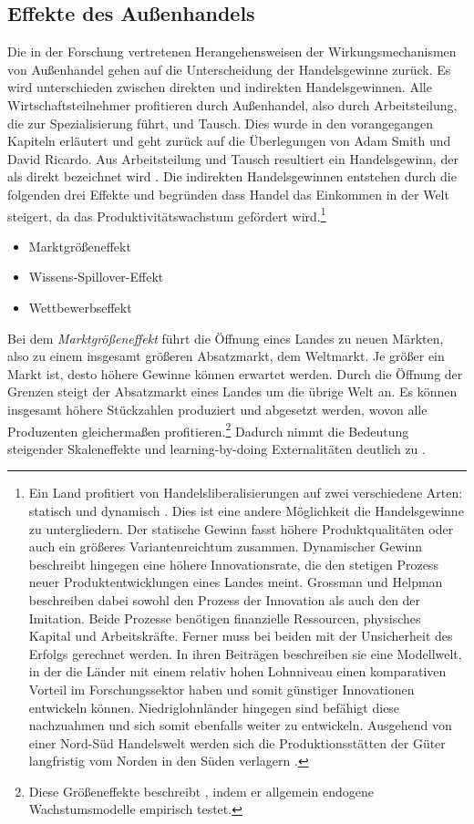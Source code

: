 \subsection{Effekte des Außenhandels}\label{Effekte Handel}
Die in der Forschung vertretenen Herangehensweisen der Wirkungsmechanismen von Außenhandel gehen auf die Unterscheidung der Handelsgewinne zurück. Es wird unterschieden zwischen direkten und indirekten Handelsgewinnen. Alle Wirtschaftsteilnehmer profitieren durch Außenhandel, also durch Arbeitsteilung, die zur Spezialisierung führt, und Tausch. Dies wurde in den vorangegangen Kapiteln erläutert und geht zurück auf die Überlegungen von Adam Smith und David Ricardo. Aus Arbeitsteilung und Tausch resultiert ein Handelsgewinn, der als direkt bezeichnet wird \cite{Mill.1909}. Die indirekten Handelsgewinnen entstehen durch die folgenden drei Effekte und begründen dass Handel das Einkommen in der Welt steigert, da das Produktivitätswachstum gefördert wird.\footnote{Ein Land profitiert von Handelsliberalisierungen auf zwei verschiedene Arten: statisch und dynamisch \cite{Grossman.1989a,Grossman.1991b,Grossman.1991c,RiveraBatiz.,RiveraBatiz.1991a}. Dies ist eine andere Möglichkeit die Handelsgewinne zu untergliedern. Der statische Gewinn fasst höhere Produktqualitäten oder auch ein größeres Variantenreichtum zusammen. Dynamischer Gewinn beschreibt hingegen eine höhere Innovationsrate, die den stetigen Prozess neuer Produktentwicklungen eines Landes meint. Grossman und Helpman beschreiben dabei sowohl den Prozess der Innovation als auch den der Imitation. Beide Prozesse benötigen finanzielle Ressourcen, physisches Kapital und Arbeitskräfte. Ferner muss bei beiden mit der Unsicherheit des Erfolgs gerechnet werden. In ihren Beiträgen beschreiben sie eine Modellwelt, in der die Länder mit einem relativ hohen Lohnniveau einen komparativen Vorteil im Forschungssektor haben und somit günstiger Innovationen entwickeln können. Niedriglohnländer hingegen sind befähigt diese nachzuahmen und sich somit ebenfalls weiter zu entwickeln. Ausgehend von einer Nord-Süd Handelswelt werden sich die Produktionsstätten der Güter langfristig vom Norden in den Süden verlagern \cite{Grossman.1991c}.}
\begin{itemize}
\item [1.] Marktgrößeneffekt
\item [2.] Wissens-Spillover-Effekt
\item [3.] Wettbewerbseffekt
\end{itemize}
Bei dem \textit{Marktgrößeneffekt} führt die Öffnung eines Landes zu neuen Märkten, also zu einem insgesamt größeren Absatzmarkt, dem Weltmarkt. Je größer ein Markt ist, desto höhere Gewinne können erwartet werden. Durch die Öffnung der Grenzen steigt der Absatzmarkt eines Landes um die übrige Welt an. Es können insgesamt höhere Stückzahlen produziert und abgesetzt werden, wovon alle Produzenten gleichermaßen profitieren.\footnote{Diese Größeneffekte beschreibt \cite{Jones.1995a}, indem er allgemein endogene Wachstumsmodelle empirisch testet.} Dadurch nimmt die Bedeutung steigender Skaleneffekte und learning-by-doing Externalitäten deutlich zu \cite[Kapitel 15]{Aghion.1998}.\\
